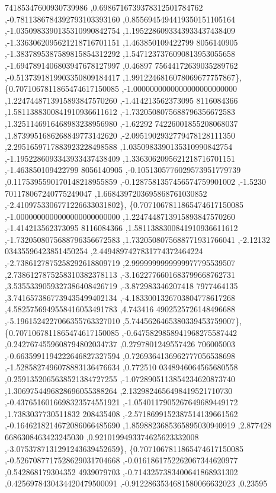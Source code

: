 \begin{DoxyCode}
      74185347600930739986 ,0.6986716739378312501784762 ,-0.7811386784392793103393160 ,0.8556945494419350151105164
       ,-1.0350983390135310990842754 ,1.1952286093343933437438409 ,-1.3363062095621218716701151 ,1.463850109422799
      8056140905 ,-1.3837895387589815854312292 ,1.5471237376090813953055658 ,-1.6947891406803947678127997 ,0.46897
      75644172639035289762 ,-0.5137391819903350809184417 ,1.9912246816078069677757867\},
\{0.7071067811865474617150085 ,-1.0000000000000000000000000 ,1.2247448713915893847570260 ,-1.414213562373095
      8116084366 ,1.5811388300841910936611612 ,-1.7320508075688796356672583 ,1.3251146916468983238956980 ,-1.62292
      74226001855208068037 ,1.8739951686268849773142620 ,-2.0951902932779478128111350 ,2.2951659717883923228498588
       ,1.0350983390135310990842754 ,-1.1952286093343933437438409 ,1.3363062095621218716701151 ,-1.463850109422799
      8056140905 ,-0.1051305776029573951779739 ,0.1175395590170148218955859 ,-0.1287581357456574759901002 ,-1.5230
      701178067240775249047 ,1.6684397203695868761030852 ,-2.4109753306771226633031802\},
\{0.7071067811865474617150085 ,-1.0000000000000000000000000 ,1.2247448713915893847570260 ,-1.414213562373095
      8116084366 ,1.5811388300841910936611612 ,-1.7320508075688796356672583 ,1.7320508075688771931766041 ,-2.12132
      03435596423851450254 ,2.4494897427831774372464224 ,-2.7386127875258292618809719 ,2.9999999999999977795539507
       ,2.7386127875258310382378113 ,-3.1622776601683799668762731 ,3.5355339059327386408426719 ,-3.872983346207418
      7977464135 ,3.7416573867739435499402134 ,-4.1833001326703804778617268 ,4.5825756949558416053491783 ,4.743416
      4902525726148496688 ,-5.1961524227066355763327010 ,5.7445626465380339453759007\},
\{0.7071067811865474617150085 ,-0.6475829858941968275587442 ,0.2427674559608794802034737 ,0.2797801249557426
      706005003 ,-0.6635991194222646827327594 ,0.7269364136962777056538698 ,-1.5285827496078883136476634 ,0.772510
      0348946064565680558 ,0.2591352065638521384727255 ,-1.0728905113854234620873740 ,1.3069754496828696055388264 
      ,2.1329824656498419521710730 ,-0.4376516016698323574551921 ,-1.0540117905267649689449172 ,1.7383037730511832
      208435408 ,-2.5718699152387514139661562 ,-0.1646218214672086066485690 ,1.8598823685365895030940919 ,2.877428
      6686308463423245030 ,0.9210199493374625623332008 ,-3.0753787131291243639452659\},
\{0.7071067811865474617150085 ,-0.5267087717528629031704668 ,-0.0161861752262067344620977 ,0.542868179304352
      4939079703 ,-0.7143257383400641868931302 ,0.4256978430434420479500091 ,-0.9122863534681580066632023 ,0.23595

\end{DoxyCode}
